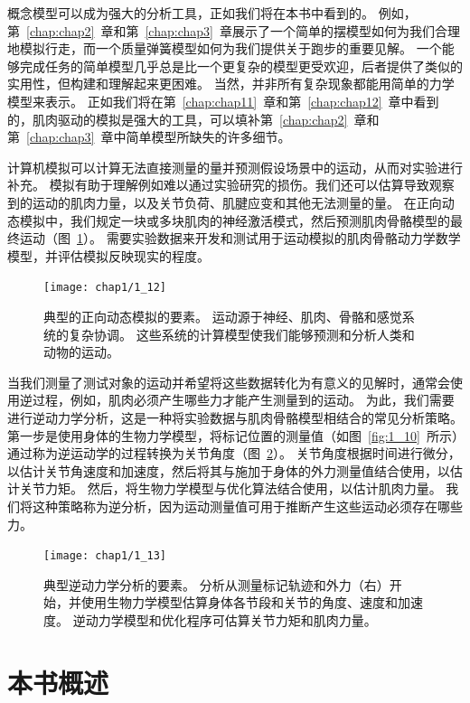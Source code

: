 概念模型可以成为强大的分析工具，正如我们将在本书中看到的。
例如，第~\ref{chap:chap2}~章和第~\ref{chap:chap3}~章展示了一个简单的摆模型如何为我们合理地模拟行走，而一个质量弹簧模型如何为我们提供关于跑步的重要见解。
一个能够完成任务的简单模型几乎总是比一个更复杂的模型更受欢迎，后者提供了类似的实用性，但构建和理解起来更困难。
当然，并非所有复杂现象都能用简单的力学模型来表示。
正如我们将在第~\ref{chap:chap11}~章和第~\ref{chap:chap12}~章中看到的，肌肉驱动的模拟是强大的工具，可以填补第~\ref{chap:chap2}~章和第~\ref{chap:chap3}~章中简单模型所缺失的许多细节。


计算机模拟可以计算无法直接测量的量并预测假设场景中的运动，从而对实验进行补充。
模拟有助于理解例如难以通过实验研究的损伤。我们还可以估算导致观察到的运动的肌肉力量，以及关节负荷、肌腱应变和其他无法测量的量。
在正向动态模拟中，我们规定一块或多块肌肉的神经激活模式，然后预测肌肉骨骼模型的最终运动（图~\ref{fig:1_12}）。
需要实验数据来开发和测试用于运动模拟的肌肉骨骼动力学数学模型，并评估模拟反映现实的程度。


\begin{figure}[!htb]
	\centering
	\texttt{[image: chap1/1\_12]}
	\caption{典型的正向动态模拟的要素。
		运动源于神经、肌肉、骨骼和感觉系统的复杂协调。
		这些系统的计算模型使我们能够预测和分析人类和动物的运动。 \label{fig:1_12}}
\end{figure}


当我们测量了测试对象的运动并希望将这些数据转化为有意义的见解时，通常会使用逆过程，例如，肌肉必须产生哪些力才能产生测量到的运动。
为此，我们需要进行逆动力学分析，这是一种将实验数据与肌肉骨骼模型相结合的常见分析策略。
第一步是使用身体的生物力学模型，将标记位置的测量值（如图~\ref{fig:1_10}~所示）通过称为逆运动学的过程转换为关节角度（图~\ref{fig:1_13}）。
关节角度根据时间进行微分，以估计关节角速度和加速度，然后将其与施加于身体的外力测量值结合使用，以估计关节力矩。
然后，将生物力学模型与优化算法结合使用，以估计肌肉力量。
我们将这种策略称为逆分析，因为运动测量值可用于推断产生这些运动必须存在哪些力。


\begin{figure}[!htb]
	\centering
	\texttt{[image: chap1/1\_13]}
	\caption{典型逆动力学分析的要素。
		分析从测量标记轨迹和外力（右）开始，并使用生物力学模型估算身体各节段和关节的角度、速度和加速度。
		逆动力学模型和优化程序可估算关节力矩和肌肉力量。 \label{fig:1_13}}
\end{figure}




\section{本书概述}

